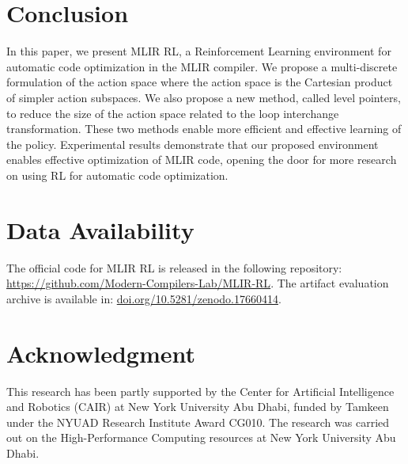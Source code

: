 \documentclass[10pt,twocolumn]{article}
\begin{document}
\section{Conclusion}

In this paper, we present MLIR RL, a Reinforcement Learning environment for automatic code optimization in the MLIR compiler. We propose a multi-discrete formulation of the action space where the action space is the Cartesian product of simpler action subspaces. We also propose a new method, called level pointers, to reduce the size of the action space related to the loop interchange transformation. These two methods enable more efficient and effective learning of the policy. Experimental results demonstrate that our proposed environment enables effective optimization of MLIR code, opening the door for more research on using RL for automatic code optimization.

\section{Data Availability}

The official code for MLIR RL is released in the following repository: \url{https://github.com/Modern-Compilers-Lab/MLIR-RL}. The artifact evaluation archive is available in: \url{doi.org/10.5281/zenodo.17660414}.

\section*{Acknowledgment}

This research has been partly supported by the Center for Artificial Intelligence and Robotics (CAIR) at New York University Abu Dhabi, funded by Tamkeen under the NYUAD Research Institute Award CG010. The research was carried out on the High-Performance Computing resources at New York University Abu Dhabi.
\end{document}
